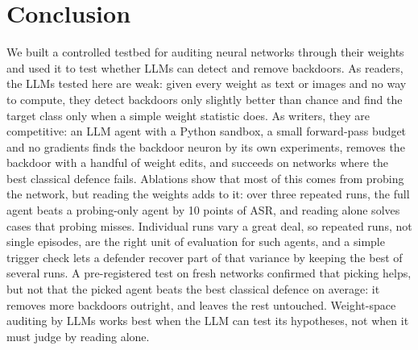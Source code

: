 \documentclass[11pt]{article}
\begin{document}
\section{Conclusion}
We built a controlled testbed for auditing neural networks through their weights and used it to test
whether LLMs can detect and remove backdoors. As readers, the LLMs tested here are weak: given every
weight as text or images and no way to compute, they detect backdoors only slightly better than chance
and find the target class only when a simple weight statistic does. As writers, they are competitive:
an LLM agent with a Python sandbox, a small forward-pass budget and no gradients finds the backdoor
neuron by its own experiments, removes the backdoor with a handful of weight edits, and succeeds on
networks where the best classical defence fails. Ablations show that most of this comes from
probing the network, but reading the weights adds to it: over three repeated runs, the full agent
beats a probing-only agent by 10 points of ASR, and reading alone solves cases that probing misses.
Individual runs vary a great deal, so repeated runs, not single episodes, are the right unit of
evaluation for such agents, and a simple trigger check lets a defender recover part of that variance by
keeping the best of several runs. A pre-registered test on fresh networks confirmed that picking helps,
but not that the picked agent beats the best classical defence on average: it removes more backdoors
outright, and leaves the rest untouched. Weight-space auditing by LLMs works best when the LLM can test its hypotheses, not
when it must judge by reading alone.

\appendix
\end{document}

